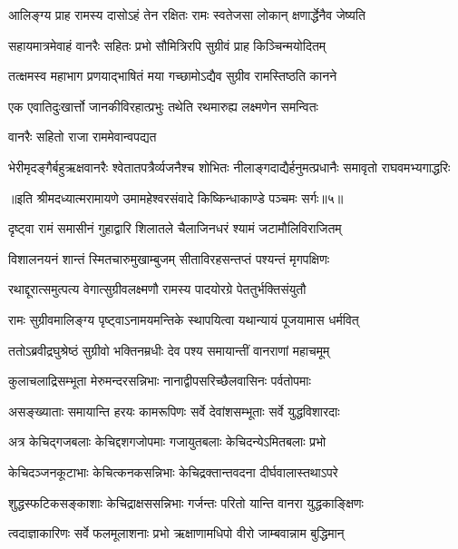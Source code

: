 \twolineshloka
{आलिङ्ग्य प्राह रामस्य दासोऽहं तेन रक्षितः}
{रामः स्वतेजसा लोकान् क्षणार्द्धेनैव जेष्यति} %

\twolineshloka
{सहायमात्रमेवाहं वानरैः सहितः प्रभो}
{सौमित्रिरपि सुग्रीवं प्राह किञ्चिन्मयोदितम्} %

\twolineshloka
{तत्क्षमस्व महाभाग प्रणयाद्भाषितं मया}
{गच्छामोऽद्यैव सुग्रीव रामस्तिष्ठति कानने} %

\twolineshloka
{एक एवातिदुःखार्त्तो जानकीविरहात्प्रभुः}
{तथेति रथमारुह्य लक्ष्मणेन समन्वितः} %

\onelineshloka
{वानरैः सहितो राजा राममेवान्वपद्यत} %

\twolineshloka
{भेरीमृदङ्गैर्बहुऋक्षवानरैः श्वेतातपत्रैर्व्यजनैश्च शोभितः}
{नीलाङ्गदाद्यैर्हनुमत्प्रधानैः समावृतो राघवमभ्यगाद्धरिः} %

{॥इति श्रीमदध्यात्मरामायणे उमामहेश्वरसंवादे किष्किन्धाकाण्डे
पञ्चमः सर्गः॥५॥
}




\twolineshloka
{दृष्ट्वा रामं समासीनं गुहाद्वारि शिलातले}
{चैलाजिनधरं श्यामं जटामौलिविराजितम्} %

\twolineshloka
{विशालनयनं शान्तं स्मितचारुमुखाम्बुजम्}
{सीताविरहसन्तप्तं पश्यन्तं मृगपक्षिणः} %

\twolineshloka
{रथाद्दूरात्समुत्पत्य वेगात्सुग्रीवलक्ष्मणौ}
{रामस्य पादयोरग्रे पेततुर्भक्तिसंयुतौ} %

\twolineshloka
{रामः सुग्रीवमालिङ्ग्य पृष्ट्वाऽनामयमन्तिके}
{स्थापयित्वा यथान्यायं पूजयामास धर्मवित्} %

\twolineshloka
{ततोऽब्रवीद्रघुश्रेष्ठं सुग्रीवो भक्तिनम्रधीः}
{देव पश्य समायान्तीं वानराणां महाचमूम्} %

\twolineshloka
{कुलाचलाद्रिसम्भूता मेरुमन्दरसन्निभाः}
{नानाद्वीपसरिच्छैलवासिनः पर्वतोपमाः} %

\twolineshloka
{असङ्ख्याताः समायान्ति हरयः कामरूपिणः}
{सर्वे देवांशसम्भूताः सर्वे युद्धविशारदाः} %

\twolineshloka
{अत्र केचिद्गजबलाः केचिद्दशगजोपमाः}
{गजायुतबलाः केचिदन्येऽमितबलाः प्रभो} %

\twolineshloka
{केचिदञ्जनकूटाभाः केचित्कनकसन्निभाः}
{केचिद्रक्तान्तवदना दीर्घवालास्तथाऽपरे} %

\twolineshloka
{शुद्धस्फटिकसङ्काशाः केचिद्राक्षससन्निभाः}
{गर्जन्तः परितो यान्ति वानरा युद्धकाङ्क्षिणः} %

\twolineshloka
{त्वदाज्ञाकारिणः सर्वे फलमूलाशनाः प्रभो}
{ऋक्षाणामधिपो वीरो जाम्बवान्नाम बुद्धिमान्} %

